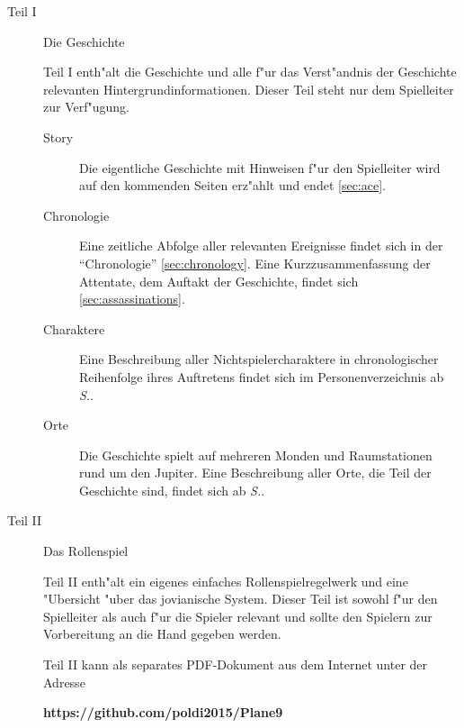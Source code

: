 \newcommand{\sfromref}[1]{ab \textit{S.\pageref{#1}}}
\begin{description}
    \item [Teil I] Die Geschichte

        Teil I enth"alt die Geschichte und alle f"ur das Verst"andnis der Geschichte relevanten Hintergrundinformationen. Dieser Teil steht nur dem Spielleiter zur Verf"ugung.
        \begin{description}
            \item [Story] Die eigentliche Geschichte mit Hinweisen f"ur den Spielleiter wird auf den kommenden Seiten erz"ahlt und endet \cref{sec:ace}.
            \item [Chronologie] Eine zeitliche Abfolge aller relevanten Ereignisse findet sich in der ``Chronologie'' 
                \cref{sec:chronology}. Eine Kurzzusammenfassung der Attentate, dem Auftakt der Geschichte, findet sich  \cref{sec:assassinations}.
            \item [Charaktere] Eine Beschreibung aller Nichtspielercharaktere in chronologischer Reihenfolge ihres Auftretens findet sich 
                im Personenverzeichnis  \sfromref{sec:nsc}.
            \item [Orte]  Die Geschichte spielt auf mehreren Monden und Raumstationen rund um den Jupiter. Eine Beschreibung aller Orte, 
                die Teil der Geschichte sind, findet sich \sfromref{sec:locations}.
        \end{description}
    \item [Teil II] Das Rollenspiel

        Teil II enth"alt ein eigenes einfaches Rollenspielregelwerk und eine "Ubersicht "uber das jovianische System. Dieser Teil ist sowohl f"ur den Spielleiter als auch f"ur die Spieler relevant und sollte den Spielern zur Vorbereitung an die Hand gegeben werden. 
    
        Teil II kann als separates PDF-Dokument aus dem Internet unter der Adresse 
        
        \textbf{https://github.com/poldi2015/Plane9}
        

\end{description}
